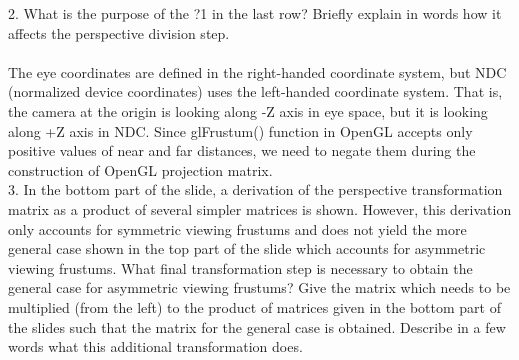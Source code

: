\documentclass[10pt,a4paper]{article}
\begin{document}
2. What is the purpose of the ?1 in the last row? Briefly explain in words how it affects the perspective division step. \\ \\

The eye coordinates are defined in the right-handed coordinate system, but NDC (normalized device coordinates) uses the left-handed coordinate system. That is, the camera at the origin is looking along -Z axis in eye space, but it is looking along +Z axis in NDC. Since glFrustum() function in OpenGL accepts only positive values of near and far distances, we need to negate them during the construction of OpenGL projection matrix. \\

3. In the bottom part of the slide, a derivation of the perspective transformation matrix as a product of several simpler matrices is shown. However, this derivation only accounts for symmetric viewing frustums and does not yield the more general case shown in the top part of the slide which accounts for asymmetric viewing frustums. What final transformation step is necessary to obtain the general case for asymmetric viewing frustums? Give the matrix which needs to be multiplied (from the left) to the product of matrices given in the bottom part of the slides such that the matrix for the general case is obtained. Describe in a few words what this additional transformation does. \\
\end{document}
